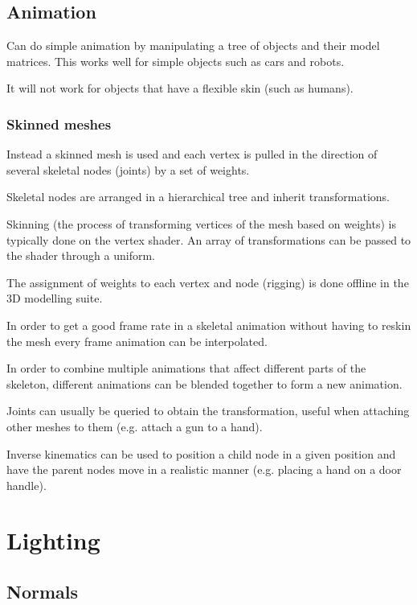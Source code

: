\documentclass[a4paper]{article}
\begin{document}
\subsection{Animation}

Can do simple animation by manipulating a tree of objects and their model
matrices. This works well for simple objects such as cars and robots.

It will not work for objects that have a flexible skin (such as humans).

\subsubsection{Skinned meshes}

Instead a skinned mesh is used and each vertex is pulled in the direction of
several skeletal nodes (joints) by a set of weights.

Skeletal nodes are arranged in a hierarchical tree and inherit transformations.

Skinning (the process of transforming vertices of the mesh based on weights) is
typically done on the vertex shader. An array of transformations can be passed
to the shader through a uniform.

The assignment of weights to each vertex and node (rigging) is done offline in
the 3D modelling suite.

In order to get a good frame rate in a skeletal animation without having to
reskin the mesh every frame animation can be interpolated.

In order to combine multiple animations that affect different parts of the
skeleton, different animations can be blended together to form a new animation.

Joints can usually be queried to obtain the transformation, useful when
attaching other meshes to them (e.g. attach a gun to a hand).

Inverse kinematics can be used to position a child node in a given position and
have the parent nodes move in a realistic manner (e.g. placing a hand on a door
handle).

\section{Lighting}

\subsection{Normals}
\end{document}
